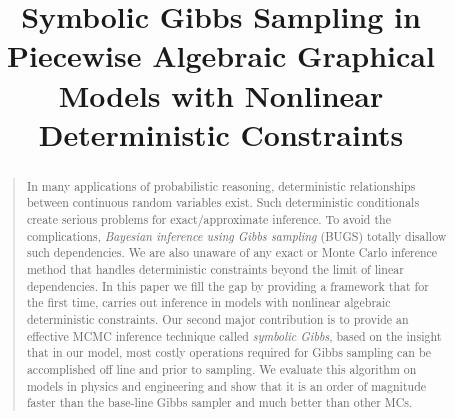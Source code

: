 \documentclass[letterpaper]{article}
\begin{document}
\title{Symbolic Gibbs Sampling in Piecewise Algebraic Graphical Models with Nonlinear Deterministic Constraints}
\author{
}


\maketitle

\begin{abstract}
\begin{quote}
In many applications of probabilistic reasoning, deterministic relationships between
continuous random variables exist. 
Such deterministic conditionals create serious problems for exact/approximate inference.
To avoid the complications, \emph{Bayesian inference using Gibbs sampling} (BUGS) totally disallow such dependencies.  
We are also unaware of any exact or Monte Carlo inference method that handles deterministic constraints beyond the limit of linear dependencies.
In this paper we fill the gap by providing a framework 
that for the first time, carries out inference in models with nonlinear algebraic deterministic constraints. %
Our second major contribution is to provide an effective MCMC inference technique called \emph{symbolic Gibbs}, based on the insight that in our model, most costly operations required for Gibbs sampling can be accomplished off line and prior to sampling. 
We evaluate this algorithm on models in physics and engineering and show that it is an order of magnitude faster than the base-line Gibbs sampler and much better than other MCs.  
\end{quote}
\end{abstract}
\end{document}
